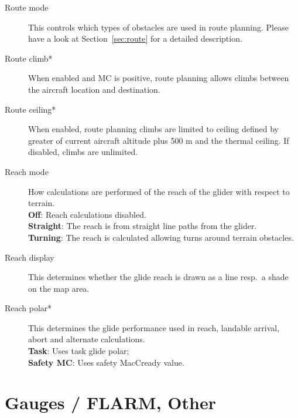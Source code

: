 \begin{description}
\item[Route mode]  \label{conf:routemode} This controls which types
  of obstacles are used in route planning. Please have a look at Section~\ref{sec:route} 
  for a detailed description.
\item[Route climb*]  \label{conf:routeclimb} When enabled and MC is positive, route 
  planning allows climbs between the aircraft location and destination.
\item[Route ceiling*]  \label{conf:routeceiling} When enabled, route planning climbs 
  are limited to ceiling defined by greater of current aircraft altitude plus 
  500 m and the thermal ceiling.  If disabled, climbs are unlimited.
\\
\item[Reach mode]  \label{conf:turningreach} How calculations are performed of 
  the reach of the glider with respect to terrain. \\
  {\bf Off}: Reach calculations disabled. \\
  {\bf Straight}: The reach is from straight line paths from the glider. \\
  {\bf Turning}: The reach is calculated allowing turns around terrain obstacles.
\item[Reach display]  \label{conf:gliderange} This determines whether the
glide reach is drawn as a line resp.\ a shade on the map area.
\item[Reach polar*]  \label{conf:reachpolar} This determines the glide performance 
  used in reach, landable arrival, abort and alternate calculations. \\
  {\bf Task}: Uses task glide polar; \\
  {\bf Safety MC}: Uses safety MacCready value.
\end{description}


\section{Gauges / FLARM, Other} \label{sec:flarmandother-gauge}

